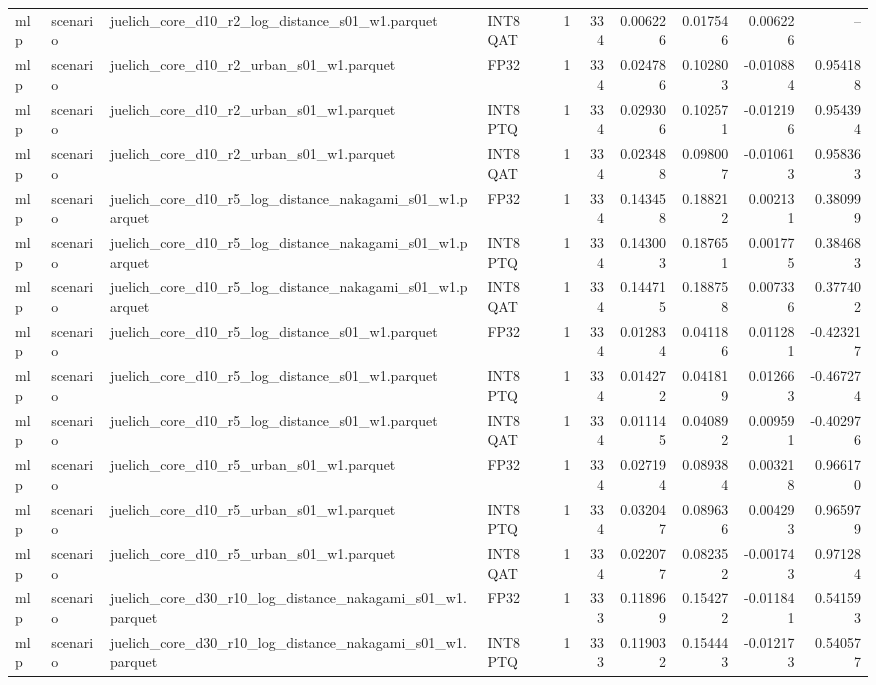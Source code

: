 \begin{tabular}{llllrrrrrr}
mlp & scenario & juelich\_core\_d10\_r2\_log\_distance\_s01\_w1.parquet & INT8 QAT & 1 & 334 & 0.006226 & 0.017546 & 0.006226 & -- \\
mlp & scenario & juelich\_core\_d10\_r2\_urban\_s01\_w1.parquet & FP32 & 1 & 334 & 0.024786 & 0.102803 & -0.010884 & 0.954188 \\
mlp & scenario & juelich\_core\_d10\_r2\_urban\_s01\_w1.parquet & INT8 PTQ & 1 & 334 & 0.029306 & 0.102571 & -0.012196 & 0.954394 \\
mlp & scenario & juelich\_core\_d10\_r2\_urban\_s01\_w1.parquet & INT8 QAT & 1 & 334 & 0.023488 & 0.098007 & -0.010613 & 0.958363 \\
mlp & scenario & juelich\_core\_d10\_r5\_log\_distance\_nakagami\_s01\_w1.parquet & FP32 & 1 & 334 & 0.143458 & 0.188212 & 0.002131 & 0.380999 \\
mlp & scenario & juelich\_core\_d10\_r5\_log\_distance\_nakagami\_s01\_w1.parquet & INT8 PTQ & 1 & 334 & 0.143003 & 0.187651 & 0.001775 & 0.384683 \\
mlp & scenario & juelich\_core\_d10\_r5\_log\_distance\_nakagami\_s01\_w1.parquet & INT8 QAT & 1 & 334 & 0.144715 & 0.188758 & 0.007336 & 0.377402 \\
mlp & scenario & juelich\_core\_d10\_r5\_log\_distance\_s01\_w1.parquet & FP32 & 1 & 334 & 0.012834 & 0.041186 & 0.011281 & -0.423217 \\
mlp & scenario & juelich\_core\_d10\_r5\_log\_distance\_s01\_w1.parquet & INT8 PTQ & 1 & 334 & 0.014272 & 0.041819 & 0.012663 & -0.467274 \\
mlp & scenario & juelich\_core\_d10\_r5\_log\_distance\_s01\_w1.parquet & INT8 QAT & 1 & 334 & 0.011145 & 0.040892 & 0.009591 & -0.402976 \\
mlp & scenario & juelich\_core\_d10\_r5\_urban\_s01\_w1.parquet & FP32 & 1 & 334 & 0.027194 & 0.089384 & 0.003218 & 0.966170 \\
mlp & scenario & juelich\_core\_d10\_r5\_urban\_s01\_w1.parquet & INT8 PTQ & 1 & 334 & 0.032047 & 0.089636 & 0.004293 & 0.965979 \\
mlp & scenario & juelich\_core\_d10\_r5\_urban\_s01\_w1.parquet & INT8 QAT & 1 & 334 & 0.022077 & 0.082352 & -0.001743 & 0.971284 \\
mlp & scenario & juelich\_core\_d30\_r10\_log\_distance\_nakagami\_s01\_w1.parquet & FP32 & 1 & 333 & 0.118969 & 0.154272 & -0.011841 & 0.541593 \\
mlp & scenario & juelich\_core\_d30\_r10\_log\_distance\_nakagami\_s01\_w1.parquet & INT8 PTQ & 1 & 333 & 0.119032 & 0.154443 & -0.012173 & 0.540577 \\

\end{tabular}
